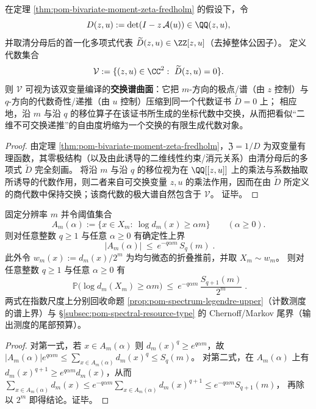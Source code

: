 \begin{theorem}[二维递推代数的交换谱曲面]\label{thm:pom-commutative-spectral-surface}
在定理 \ref{thm:pom-bivariate-moment-zeta-fredholm} 的假设下，令
\[
D(z,u):=\det(I-z\,\mathcal{A}(u))\in\QQ(z,u),
\]
并取清分母后的首一化多项式代表 \(\widetilde D(z,u)\in\ZZ[z,u]\)（去掉整体公因子）。
定义代数集合
\[
\mathcal{V}:=\{(z,u)\in\CC^{2}:\ \widetilde D(z,u)=0\}.
\]
则 \(\mathcal{V}\) 可视为该双变量编译的\textbf{交换谱曲面}：它把 \(m\)-方向的极点/谱（由 \(z\) 控制）与 \(q\)-方向的代数奇性/递推（由 \(u\) 控制）压缩到同一个代数证书 \(\widetilde D=0\) 上；
相应地，沿 \(m\) 与沿 \(q\) 的移位算子在该证书所生成的坐标代数中交换，从而把看似“二维不可交换递推”的自由度坍缩为一个交换的有限生成代数对象。
\end{theorem}
\begin{proof}
由定理 \ref{thm:pom-bivariate-moment-zeta-fredholm}，\(\mathfrak{Z}=1/D\) 为双变量有理函数，其零极结构（以及由此诱导的二维线性约束/消元关系）由清分母后的多项式 \(\widetilde D\) 完全刻画。
将沿 \(m\) 与沿 \(q\) 的移位视为在 \(\QQ[[z,u]]\) 上的乘法与系数抽取所诱导的代数作用，则二者来自可交换变量 \(z,u\) 的乘法作用，因而在由 \(\widetilde D\) 所定义的商代数中保持交换；该商代数的极大谱自然包含于 \(\mathcal{V}\)。
证毕。
\end{proof}





\begin{proposition}\label{prop:pom-chernoff-threshold-bounds}
固定分辨率 \(m\) 并令阈值集合
\[
A_m(\alpha):=\{x\in X_m:\ \log d_m(x)\ge \alpha m\}\qquad(\alpha\ge 0).
\]
则对任意整数 \(q\ge 1\) 与任意 \(\alpha\ge 0\) 有确定性上界
\[
\boxed{\;
|A_m(\alpha)|\ \le\ e^{-q\alpha m}\,S_q(m)\; }.
\]
此外令 \(w_m(x):=d_m(x)/2^m\) 为均匀微态的折叠推前，并取 \(X_m\sim w_m\)。
则对任意整数 \(q\ge 1\) 与任意 \(\alpha\ge 0\) 有
\[
\boxed{\;
\mathbb{P}\bigl(\log d_m(X_m)\ge \alpha m\bigr)
\ \le\ e^{-q\alpha m}\,\frac{S_{q+1}(m)}{2^m}\; }.
\]
两式在指数尺度上分别回收命题 \ref{prop:pom-spectrum-legendre-upper}（计数测度的谱上界）与 \S\ref{subsec:pom-spectral-resource-type} 的 Chernoff/Markov 尾界（输出测度的尾部预算）。
\end{proposition}
\begin{proof}
对第一式，若 \(x\in A_m(\alpha)\) 则 \(d_m(x)^q\ge e^{q\alpha m}\)，故
\(
|A_m(\alpha)|e^{q\alpha m}\le \sum_{x\in A_m(\alpha)}d_m(x)^q\le S_q(m)
\)。
对第二式，在 \(A_m(\alpha)\) 上有 \(d_m(x)^{q+1}\ge e^{q\alpha m}d_m(x)\)，从而
\(
\sum_{x\in A_m(\alpha)}d_m(x)\le e^{-q\alpha m}\sum_{x\in A_m(\alpha)}d_m(x)^{q+1}\le e^{-q\alpha m}S_{q+1}(m)
\)，
再除以 \(2^m\) 即得结论。证毕。
\end{proof}

